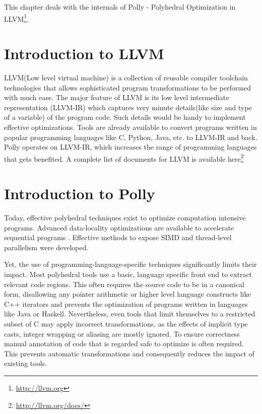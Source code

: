 \label{chap:polly}

This chapter deals with the internals of  Polly - Polyhedral Optimization
in LLVM\footnote{\url{http://llvm.org}}.

\section{Introduction to LLVM}

LLVM(Low level virtual machine)\cite{Lattner} is a collection of reusable compiler toolchain technologies that 
allows sophisticated program transformations to be performed with much ease. The
major feature of LLVM is its low level intermediate representation
(LLVM-IR) 
which captures very minute details(like size and type of a variable) of the program code.
Such details would be handy to implement effective optimizations. Tools
are already available to convert programs written in popular programming
languages like C, Python, Java, etc. to LLVM-IR and back. Polly operates
on LLVM-IR, which increases the range of programming languages that gets
benefited. A complete list of documents for LLVM is available here\footnote{\url{http://llvm.org/docs/}}


\section{Introduction to Polly}

Today, effective polyhedral techniques exist to optimize computation intensive
programs.  Advanced data-locality optimizations are available to accelerate
sequential programs \cite{pluto}. Effective methods to expose SIMD and
thread-level parallelism were developed.

Yet, the use of programming-language-specific techniques significantly limits
their impact.  Most polyhedral tools use a basic, language specific front end
to extract relevant code regions. This often requires the source code to be in
a canonical form, disallowing any pointer arithmetic or higher level
language constructs like C++ iterators and prevents the optimization of
programs written in languages like Java or Haskell. Nevertheless, even tools
that limit themselves to a restricted subset of C may apply incorrect
transformations, as the effects of implicit type casts, integer wrapping or
aliasing are mostly ignored. To ensure correctness manual annotation
of code that is regarded safe to optimize is often required.  This prevents
automatic transformations and consequently reduces the impact of existing
tools.

